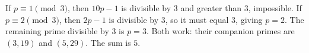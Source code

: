If $p\equiv1\pmod3$, then $10p-1$ is divisible by $3$ and greater than $3$, impossible. If $p\equiv2\pmod3$, then $2p-1$ is divisible by $3$, so it must equal $3$, giving $p=2$. The remaining prime divisible by $3$ is $p=3$. Both work: their companion primes are $(3,19)$ and $(5,29)$. The sum is $\boxed5$.
